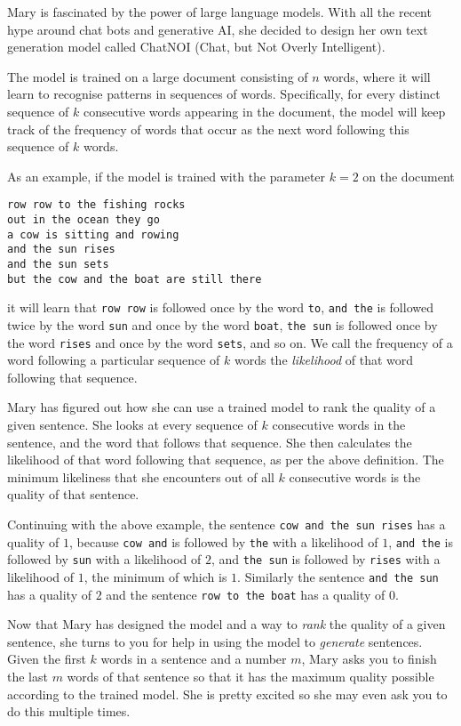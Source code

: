 Mary is fascinated by the power of large language models. With all the recent
hype around chat bots and generative AI, she decided to design her own text
generation model called ChatNOI (Chat, but Not Overly Intelligent).

The model is trained on a large document consisting of $n$ words, where it will
learn to recognise patterns in sequences of words. Specifically, for every
distinct sequence of $k$ consecutive words appearing in the document, the model
will keep track of the frequency of words that occur as the next word following
this sequence of $k$ words.

As an example, if the model is trained with the parameter $k = 2$ on the document
\begin{center}
\begin{verbatim}
row row to the fishing rocks
out in the ocean they go
a cow is sitting and rowing
and the sun rises
and the sun sets
but the cow and the boat are still there
\end{verbatim}
\end{center}
it will learn that \texttt{row row} is followed once by the word \texttt{to},
\texttt{and the} is followed twice by the word \texttt{sun} and once by the
word \texttt{boat}, \texttt{the sun} is followed once by the word
\texttt{rises} and once by the word \texttt{sets}, and so on. We call the
frequency of a word following a particular sequence of $k$ words the
\textit{likelihood} of that word following that sequence.

Mary has figured out how she can use a trained model to rank the quality of a
given sentence. She looks at every sequence of $k$ consecutive words in the
sentence, and the word that follows that sequence. She then calculates the
likelihood of that word following that sequence, as per the above
definition. The minimum likeliness that she encounters out of all $k$
consecutive words is the quality of that sentence.

Continuing with the above example, the sentence \texttt{cow and the sun rises}
has a quality of $1$, because \texttt{cow and} is followed by \texttt{the} with
a likelihood of $1$, \texttt{and the} is followed by \texttt{sun} with a
likelihood of $2$, and \texttt{the sun} is followed by \texttt{rises} with a
likelihood of $1$, the minimum of which is $1$. Similarly the sentence
\texttt{and the sun} has a quality of $2$ and the sentence \texttt{row to the
boat} has a quality of $0$.

Now that Mary has designed the model and a way to \textit{rank} the quality of
a given sentence, she turns to you for help in using the model to
\textit{generate} sentences. Given the first $k$ words in a sentence and a
number $m$, Mary asks you to finish the last $m$ words of that sentence so that
it has the maximum quality possible according to the trained model. She is
pretty excited so she may even ask you to do this multiple times.

